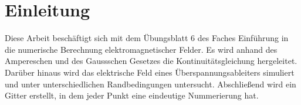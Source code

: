 \chapter{Einleitung}\label{sec:intro}
Diese Arbeit beschäftigt sich mit dem Übungsblatt 6 des Faches \glqq Einführung in die numerische Berechnung elektromagnetischer Felder\grqq{}. Es wird anhand des Ampereschen und des Gaussschen Gesetzes die Kontinuitätsgleichung hergeleitet. Darüber hinaus wird das elektrische Feld eines Überspannungsableiters simuliert und unter unterschiedlichen Randbedingungen untersucht. Abschließend wird ein Gitter erstellt, in dem jeder Punkt eine eindeutige Nummerierung hat.